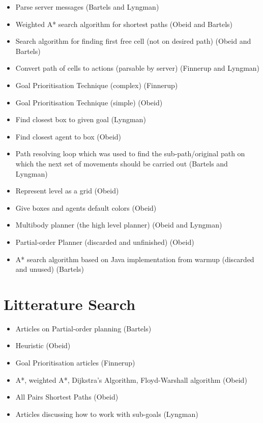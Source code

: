 \documentclass[a4paper]{article}
\newcommand{\jens}{Finnerup}
\newcommand{\sune}{Bartels}
\newcommand{\superdude}{Lyngman}
\newcommand{\elias}{Obeid}
\begin{document}
\begin{itemize}
  \item Parse server messages (\sune{} and \superdude)
  \item Weighted A* search algorithm for shortest paths (\elias{} and \sune)
  \item Search algorithm for finding first free cell (not on desired path) (\elias{} and \sune)
  \item Convert path of cells to actions (parsable by server) (\jens{} and \superdude)
  \item Goal Prioritisation Technique (complex) (\jens)
  \item Goal Prioritisation Technique (simple) (\elias)
  \item Find closest box to given goal (\superdude)
  \item Find closest agent to box (\elias)
  \item Path resolving loop which was used to find the sub-path/original path on which the next set of movements should be carried out (\sune{} and \superdude)
  \item Represent level as a grid (\elias)
  \item Give boxes and agents default colors (\elias)
  \item Multibody planner (the high level planner) (\elias{} and \superdude)
  \item Partial-order Planner (discarded and unfinished) (\elias)
  \item A* search algorithm based on Java implementation from warmup (discarded and unused) (\sune)
\end{itemize}

\section{Litterature Search}
\begin{itemize}
  \item Articles on Partial-order planning (\sune)
  \item Heuristic (\elias)
  \item Goal Prioritisation articles (\jens)
  \item A*, weighted A*, Dijkstra's Algorithm, Floyd-Warshall algorithm (\elias)
  \item All Pairs Shortest Paths (\elias)
  \item Articles discussing how to work with sub-goals (\superdude)
\end{itemize}
\end{document}
